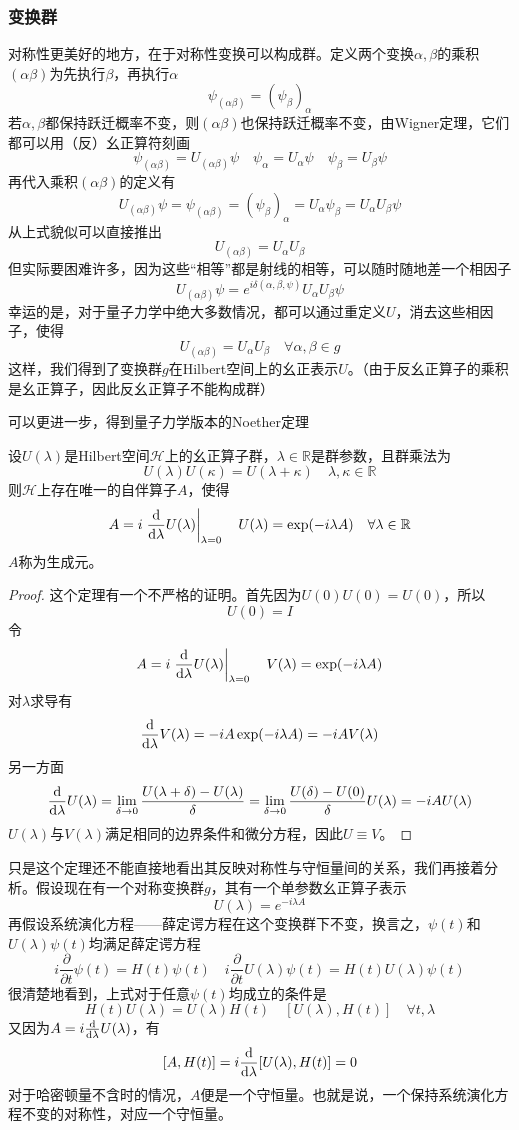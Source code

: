 \subsubsection{变换群}
对称性更美好的地方，在于对称性变换可以构成群。定义两个变换$\alpha,\beta$的乘积$(\alpha\beta)$为先执行$\beta$，再执行$\alpha$
$$\psi_{(\alpha\beta)}=\left(\psi_{\beta}\right)_{\alpha}$$
若$\alpha,\beta$都保持跃迁概率不变，则$(\alpha\beta)$也保持跃迁概率不变，由Wigner定理，它们都可以用（反）幺正算符刻画
$$\psi_{(\alpha\beta)}=U_{(\alpha\beta)}\psi\quad \psi_\alpha=U_\alpha\psi\quad \psi_\beta=U_\beta\psi$$
再代入乘积$(\alpha\beta)$的定义有
$$U_{(\alpha\beta)}\psi=\psi_{(\alpha\beta)}=(\psi_\beta)_\alpha=U_\alpha\psi_\beta=U_\alpha U_\beta\psi$$
从上式貌似可以直接推出
$$U_{(\alpha\beta)}=U_\alpha U_\beta$$
但实际要困难许多，因为这些“相等”都是射线的相等，可以随时随地差一个相因子
$$U_{(\alpha\beta)}\psi=e^{i\delta(\alpha,\beta,\psi)}U_\alpha U_\beta\psi$$
幸运的是，对于量子力学中绝大多数情况，都可以通过重定义$U$，消去这些相因子，使得
$$U_{(\alpha\beta)}=U_\alpha U_\beta\quad\forall\alpha,\beta\in g$$
这样，我们得到了变换群$g$在Hilbert空间上的幺正表示$U$。（由于反幺正算子的乘积是幺正算子，因此反幺正算子不能构成群）

可以更进一步，得到量子力学版本的Noether定理
\begin{theorem}\label{Noether}
    设$U(\lambda)$是Hilbert空间$\mathcal{H}$上的幺正算子群，$\lambda\in\mathbb{R}$是群参数，且群乘法为
    $$U(\lambda)U(\kappa)=U(\lambda+\kappa)\quad \lambda,\kappa\in\mathbb{R}$$
    则$\mathcal{H}$上存在唯一的自伴算子$A$，使得
    $$A=i\left.\frac{\mathrm{d}}{\mathrm{d}\lambda}U(\lambda)\right|_{\lambda=0}\quad U(\lambda)=\exp(-i\lambda A)\quad\forall\lambda\in\mathbb{R}$$
    $A$称为生成元。
\end{theorem}
\begin{proof}
    这个定理有一个不严格的证明。首先因为$U(0)U(0)=U(0)$，所以
    $$U(0)=I$$
    令
    $$A=i\left.\frac{\mathrm{d}}{\mathrm{d}\lambda}U(\lambda)\right|_{\lambda=0}\quad V(\lambda)=\exp(-i\lambda A)$$
    对$\lambda$求导有
    $$\frac{\mathrm{d}}{\mathrm{d}\lambda}V(\lambda)=-iA\exp(-i\lambda A)=-iAV(\lambda)$$
    另一方面
    $$\frac{\mathrm{d}}{\mathrm{d}\lambda}U(\lambda)=\lim_{\delta\to 0}\frac{U(\lambda+\delta)-U(\lambda)}{\delta}=\lim_{\delta\to 0}\frac{U(\delta)-U(0)}{\delta}U(\lambda)=-iAU(\lambda)$$
    $U(\lambda)$与$V(\lambda)$满足相同的边界条件和微分方程，因此$U\equiv V$。
\end{proof}
只是这个定理还不能直接地看出其反映对称性与守恒量间的关系，我们再接着分析。假设现在有一个对称变换群$g$，其有一个单参数幺正算子表示
$$U(\lambda)=e^{-i\lambda A}$$
再假设系统演化方程——薛定谔方程在这个变换群下不变，换言之，$\psi(t)$和$U(\lambda)\psi(t)$均满足薛定谔方程
$$i\frac{\partial}{\partial t}\psi(t)=H(t)\psi(t)\quad i\frac{\partial}{\partial t}U(\lambda)\psi(t)=H(t)U(\lambda)\psi(t)$$
很清楚地看到，上式对于任意$\psi(t)$均成立的条件是
$$H(t)U(\lambda)=U(\lambda)H(t)\quad [U(\lambda),H(t)]\quad \forall t,\lambda$$
又因为$A=i\frac{\mathrm{d}}{\mathrm{d}\lambda}U(\lambda)$，有
$$[A,H(t)]=i\frac{\mathrm{d}}{\mathrm{d} \lambda}[U(\lambda),H(t)]=0$$
对于哈密顿量不含时的情况，$A$便是一个守恒量。也就是说，一个保持系统演化方程不变的对称性，对应一个守恒量。

